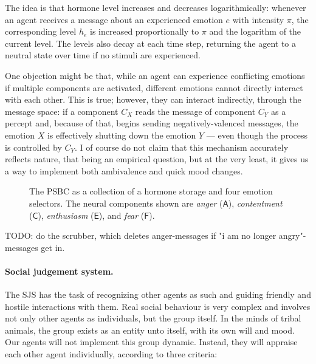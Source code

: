The idea is that hormone level increases and decreases logarithmically: whenever an agent receives a message about an experienced emotion $e$ with intensity $\pi$, the corresponding level $h_e$ is increased proportionally to $\pi$ and the logarithm of the current level. The levels also decay at each time step, returning the agent to a neutral state over time if no stimuli are experienced.

One objection might be that, while an agent can experience conflicting emotions if multiple components are activated, different emotions cannot directly interact with each other. This is true; however, they can interact indirectly, through the message space: if a component $C_X$ reads the message of component $C_Y$ as a percept and, because of that, begins sending negatively-valenced messages, the emotion $X$ is effectively shutting down the emotion $Y$ --- even though the process is controlled by $C_Y$. I of course do not claim that this mechanism accurately reflects nature, that being an empirical question, but at the very least, it gives us a way to implement both ambivalence and quick mood changes.

\begin{figure}
	\centering
	
	\caption{The PSBC as a collection of a hormone storage and four emotion selectors. The neural components shown are {\em anger} ($\mathsf{A}$), {\em contentment} ($\mathsf{C}$), {\em enthusiasm} ($\mathsf{E}$), and {\em fear} ($\mathsf{F}$).}
	\label{fig:PSBC_system}
\end{figure}

TODO: do the scrubber, which deletes anger-messages if "i am no longer angry"-messages get in.

\paragraph{Social judgement system.} The SJS has the task of recognizing other agents as such and guiding friendly and hostile interactions with them. Real social behaviour is very complex and involves not only other agents as individuals, but the group itself. In the minds of tribal animals, the group exists as an entity unto itself, with its own will and mood. Our agents will not implement this group dynamic. Instead, they will appraise each other agent individually, according to three criteria:


